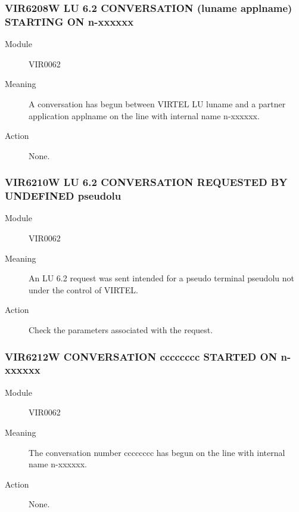 \documentclass[letterpaper,10pt,english]{sphinxmanual}
\begin{document}
\subsubsection{VIR6208W LU 6.2 CONVERSATION (luname \textendash{} applname) STARTING ON n-xxxxxx}
\label{\detokenize{messages:vir6208w-lu-6-2-conversation-luname-applname-starting-on-n-xxxxxx}}\begin{description}
\item[{Module}] \leavevmode
VIR0062

\item[{Meaning}] \leavevmode
A conversation has begun between VIRTEL LU luname and a partner application applname on the line with internal name n-xxxxxx.

\item[{Action}] \leavevmode
None.

\end{description}


\subsubsection{VIR6210W LU 6.2 CONVERSATION REQUESTED BY UNDEFINED pseudolu}
\label{\detokenize{messages:vir6210w-lu-6-2-conversation-requested-by-undefined-pseudolu}}\begin{description}
\item[{Module}] \leavevmode
VIR0062

\item[{Meaning}] \leavevmode
An LU 6.2 request was sent intended for a pseudo terminal pseudolu not under the control of VIRTEL.

\item[{Action}] \leavevmode
Check the parameters associated with the request.

\end{description}


\subsubsection{VIR6212W CONVERSATION cccccccc STARTED  ON n-xxxxxx}
\label{\detokenize{messages:vir6212w-conversation-cccccccc-started-on-n-xxxxxx}}\begin{description}
\item[{Module}] \leavevmode
VIR0062

\item[{Meaning}] \leavevmode
The conversation number cccccccc has begun on the line with internal name n-xxxxxx.

\item[{Action}] \leavevmode
None.

\end{description}
\end{document}
